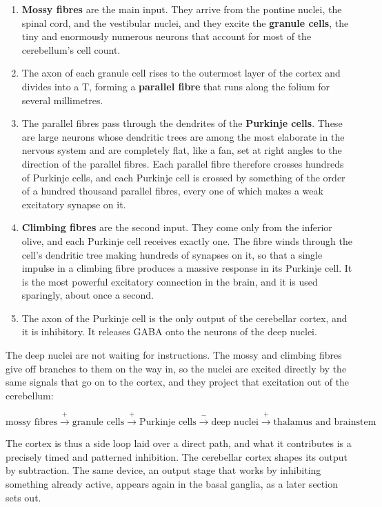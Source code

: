 \documentclass[11pt]{article}
\begin{document}
\begin{enumerate}
    \item \textbf{Mossy fibres} are the main input. They arrive from the pontine nuclei, the spinal cord, and the vestibular nuclei, and they excite the \textbf{granule cells}, the tiny and enormously numerous neurons that account for most of the cerebellum's cell count.
    \item The axon of each granule cell rises to the outermost layer of the cortex and divides into a T, forming a \textbf{parallel fibre} that runs along the folium for several millimetres.
    \item The parallel fibres pass through the dendrites of the \textbf{Purkinje cells}. These are large neurons whose dendritic trees are among the most elaborate in the nervous system and are completely flat, like a fan, set at right angles to the direction of the parallel fibres. Each parallel fibre therefore crosses hundreds of Purkinje cells, and each Purkinje cell is crossed by something of the order of a hundred thousand parallel fibres, every one of which makes a weak excitatory synapse on it.
    \item \textbf{Climbing fibres} are the second input. They come only from the inferior olive, and each Purkinje cell receives exactly one. The fibre winds through the cell's dendritic tree making hundreds of synapses on it, so that a single impulse in a climbing fibre produces a massive response in its Purkinje cell. It is the most powerful excitatory connection in the brain, and it is used sparingly, about once a second.
    \item The axon of the Purkinje cell is the only output of the cerebellar cortex, and it is inhibitory. It releases GABA onto the neurons of the deep nuclei.
\end{enumerate}

The deep nuclei are not waiting for instructions. The mossy and climbing fibres give off branches to them on the way in, so the nuclei are excited directly by the same signals that go on to the cortex, and they project that excitation out of the cerebellum:

\[
\text{mossy fibres} \xrightarrow{\;+\;} \text{granule cells} \xrightarrow{\;+\;} \text{Purkinje cells} \xrightarrow{\;-\;} \text{deep nuclei} \xrightarrow{\;+\;} \text{thalamus and brainstem}
\]

The cortex is thus a side loop laid over a direct path, and what it contributes is a precisely timed and patterned inhibition. The cerebellar cortex shapes its output by subtraction. The same device, an output stage that works by inhibiting something already active, appears again in the basal ganglia, as a later section sets out.
\end{document}
